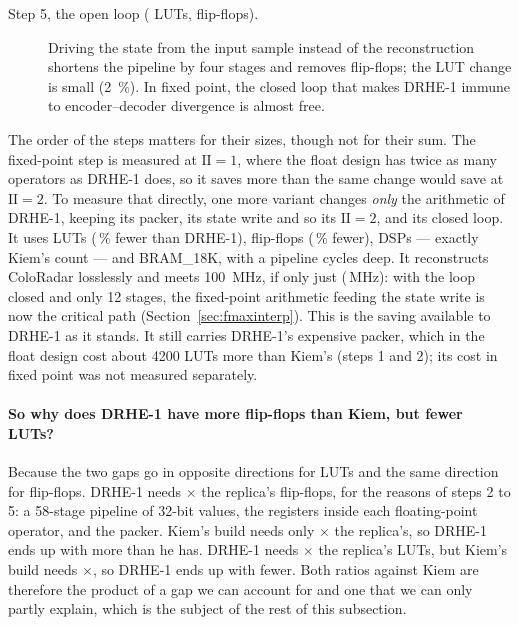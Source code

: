 \begin{description}
\item[Step 5, the open loop (  LUTs,
  flip-flops).] Driving the state from the
input sample instead of the reconstruction shortens the pipeline by four
stages and removes  flip-flops; the LUT change is small (\SI{2}{\percent}). In fixed point, the closed loop that makes DRHE-1 immune to
encoder--decoder divergence is almost free.
\end{description}

\noindent
The order of the steps matters for their sizes, though not for their sum. The
fixed-point step is measured at $\mathrm{II} = 1$, where the float design has
twice as many operators as DRHE-1 does, so it saves more than the same change
would save at $\mathrm{II} = 2$. To measure that directly, one more
variant changes \emph{only} the arithmetic of DRHE-1, keeping its packer, its
state write and so its $\mathrm{II} = 2$, and its closed loop. It uses
 LUTs (\,\% fewer than DRHE-1),
 flip-flops (\,\% fewer),  DSPs
--- exactly Kiem's count --- and  BRAM\_18K, with a pipeline
 cycles deep. It reconstructs ColoRadar losslessly and meets
\SI{100}{\mega\hertz}, if only just (\,MHz): with the loop
closed and only 12 stages, the fixed-point arithmetic feeding the state write
is now the critical path (Section~\ref{sec:fmaxinterp}). This is the saving available to DRHE-1 as it stands. It still carries DRHE-1's
expensive packer, which in the float design cost about \num{4200} LUTs more
than Kiem's (steps 1 and 2); its cost in fixed point was not measured
separately.

\paragraph{So why does DRHE-1 have more flip-flops than Kiem, but fewer LUTs?}
Because the two gaps go in opposite directions for LUTs and the same direction
for flip-flops. DRHE-1 needs $\times$ the replica's
flip-flops, for the reasons of steps 2 to 5: a 58-stage pipeline of 32-bit values, the
registers inside each floating-point operator, and the packer. Kiem's build
needs only $\times$ the replica's, so DRHE-1 ends up with
more than he has. DRHE-1 needs $\times$ the replica's
LUTs, but Kiem's build needs $\times$, so DRHE-1 ends up
with fewer. Both ratios against Kiem are therefore the product of a gap we can
account for and one that we can only partly explain, which is the subject of
the rest of this subsection.


